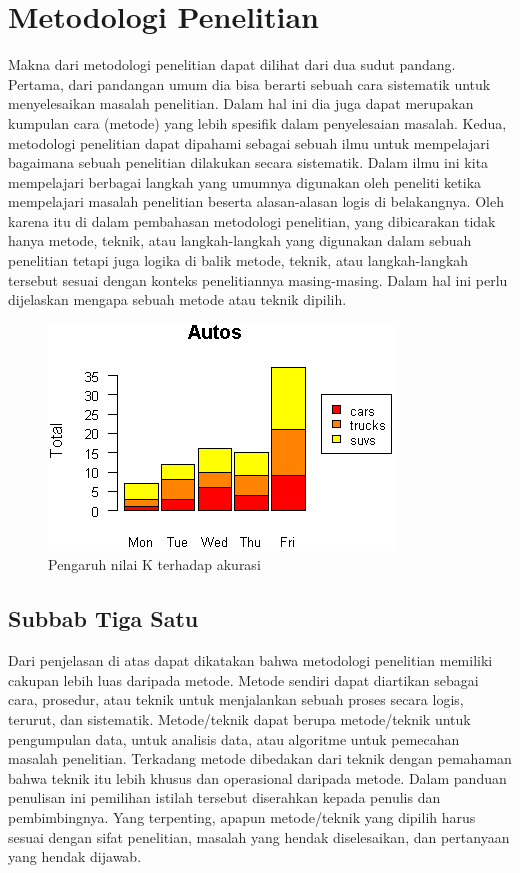 \newpage
\chapter{Metodologi Penelitian}

Makna dari metodologi penelitian dapat dilihat dari dua sudut pandang. Pertama, dari pandangan umum dia bisa berarti sebuah cara sistematik untuk menyelesaikan masalah penelitian. Dalam hal ini dia juga dapat merupakan kumpulan cara (metode) yang lebih spesifik dalam penyelesaian masalah. Kedua, metodologi penelitian dapat dipahami sebagai sebuah ilmu untuk mempelajari bagaimana sebuah penelitian dilakukan secara sistematik. Dalam ilmu ini kita mempelajari berbagai langkah yang umumnya digunakan oleh peneliti ketika mempelajari masalah penelitian beserta alasan-alasan logis di belakangnya. Oleh karena itu di dalam pembahasan metodologi penelitian, yang dibicarakan tidak hanya metode, teknik, atau langkah-langkah yang digunakan dalam sebuah penelitian tetapi juga logika di balik metode, teknik, atau langkah-langkah tersebut sesuai dengan konteks penelitiannya masing-masing. Dalam hal ini perlu dijelaskan mengapa sebuah metode atau teknik dipilih. 

\begin{figure}[ht]
  \centering
  \includegraphics[width=.5\textwidth]{babs/images/bar_script4.png}
  \caption{Pengaruh nilai K terhadap akurasi}
  \label{fig:pengaruh2}
\end{figure}


\section{Subbab Tiga Satu}
Dari penjelasan di atas dapat dikatakan bahwa metodologi penelitian memiliki cakupan lebih luas daripada metode. Metode sendiri dapat diartikan sebagai cara, prosedur, atau teknik untuk menjalankan sebuah proses secara logis, terurut, dan sistematik. Metode/teknik dapat berupa metode/teknik untuk pengumpulan data, untuk analisis data, atau algoritme untuk pemecahan masalah penelitian. Terkadang metode dibedakan dari teknik dengan pemahaman bahwa teknik itu lebih khusus dan operasional daripada metode. Dalam panduan penulisan ini pemilihan istilah tersebut diserahkan kepada penulis dan pembimbingnya. Yang terpenting, apapun metode/teknik yang dipilih harus sesuai dengan sifat penelitian, masalah yang hendak diselesaikan, dan pertanyaan yang hendak dijawab. 

